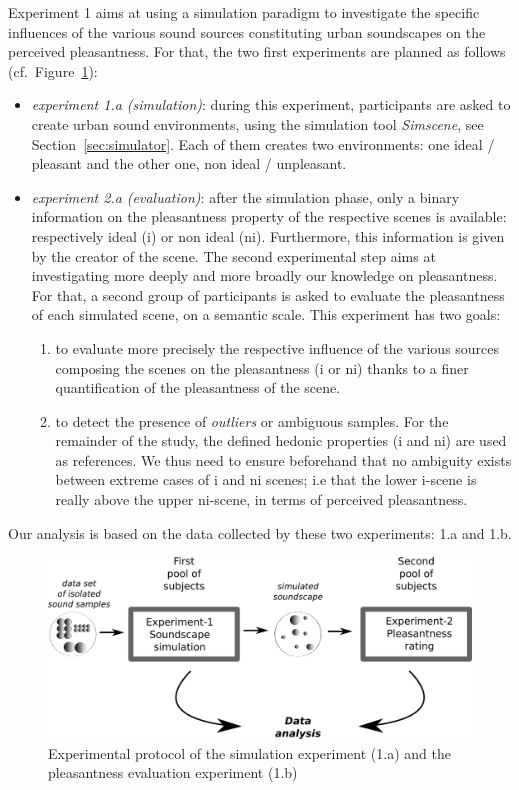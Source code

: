\documentclass[preprint,12pt]{elsarticle}
\newcommand{\cf}{cf.}
\newcommand{\myfloatalign}{\centering}
\begin{document}
Experiment 1 aims at using a simulation paradigm to investigate the specific influences of the various sound sources constituting urban soundscapes on the perceived pleasantness. For that, the two first experiments are planned as follows (\cf~Figure~\ref{fig:xp1_2}):
\begin{itemize}
\item \emph{experiment 1.a (simulation)}: during this experiment, participants are asked to create urban sound environments, using the simulation tool \emph{Simscene}, see Section~\ref{sec:simulator}. Each of them creates two environments: one ideal / pleasant and the other one, non ideal / unpleasant.
\item \emph{experiment 2.a (evaluation)}: after the simulation phase, only a binary information on the pleasantness property of the respective scenes is available: respectively ideal (i) or non ideal (ni). Furthermore, this information is given by the creator of the scene. The second experimental step aims at investigating more deeply and more broadly our knowledge on pleasantness. For that, a second group of participants is asked to evaluate the pleasantness of each simulated scene, on a semantic scale. This experiment has two goals:
\begin{enumerate}
\item to evaluate more precisely the respective influence of the various sources composing the scenes on the pleasantness  (i or ni) thanks to a finer quantification of the pleasantness of the scene.
\item to detect the presence of \emph{outliers} or ambiguous samples. For the remainder of the study, the defined hedonic properties (i and ni) are used as references. We thus need to ensure beforehand that no ambiguity exists between extreme cases of i and ni scenes; i.e that the lower i-scene is really above the upper ni-scene,  in terms of perceived pleasantness.
\end{enumerate}
\end{itemize}

Our analysis is based on the data collected by these two experiments: 1.a and 1.b.

\begin{figure}[t]
        \myfloatalign
        \includegraphics[width=\linewidth]{gfx/ch_5/5.png}
        \caption{Experimental protocol of the simulation experiment (1.a) and the pleasantness evaluation experiment (1.b)}\label{fig:xp1_2}
\end{figure}
\end{document}
